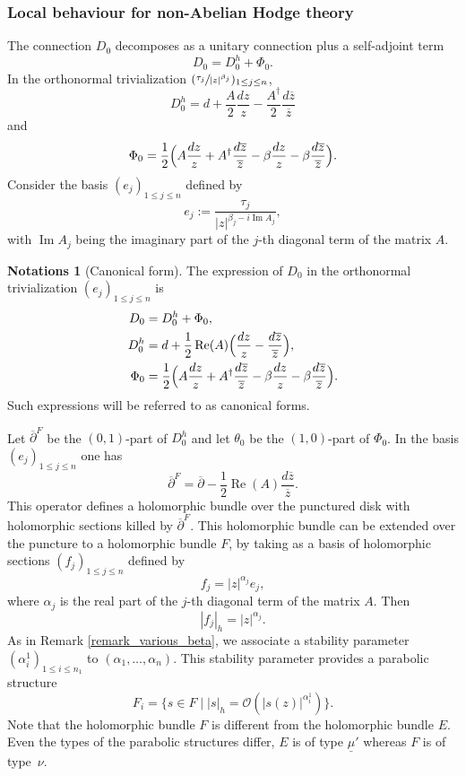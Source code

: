 \documentclass[JEP,XML,SOM,NoEqCountersInSection,Unicode,published]{cedram}
\theoremstyle{definition}
\newtheorem{notations}[definition]{Notations}
\theoremstyle{plain}
\DeclareMathOperator{\Imm}{Im}
\DeclareMathOperator{\Ree}{Re}
\newcommand{\drond}{\overline{\partial}}
\begin{document}
\subsubsection{Local behaviour for non-Abelian Hodge theory}\label{subsection_local_naht}
The connection $D_0$ decomposes as a unitary connection plus a self-adjoint term
\[
D_0= D_0^h + \Phi_0.
\]
In the orthonormal trivialization $(\sfrac{\tau_j}{|z|^{\beta_j }})_{1\le j \le n}$,
\[
D_0^h = d + \frac{A}{2} \frac{d z}{z} - \frac{A^{\dagger}}{2} \frac{d\overline{z}}{\overline{z}}
\]
and
\[
\Phi_0 = \frac{1}{2} \Bigl(A\frac{d z}{z} + A^{\dagger}\frac{d\overline{z}}{\overline{z}} - \beta \frac{d z}{z} - \beta \frac{d \overline{z}}{\overline{z}}\Bigr).
\]
Consider the basis $(e_j)_{1\le j \le n} $ defined by
\[
e_j := \frac{\tau_j}{\left|z\right|^{\beta_j- i \Imm A_j}},
\]
with $\Imm A_j$ being the imaginary part of the $j$-th diagonal term of the matrix $A$.
\begin{notations}[Canonical form]\label{notations_canonical_form}
The expression of $D_0$ in the orthonormal trivialization $(e_j)_{1\le j\le n}$ is
\begin{align*}
D_0 &= D_0^h + \Phi_0,\\
D_0^h &= d +\frac{1}{2} \Ree (A) \Bigl(\frac{d z}{z}- \frac{d\overline{z}}{\overline{z}}\Bigr),\\
\Phi_0 &= \frac{1}{2} \Bigl(A\frac{d z}{z} + A^{\dagger}\frac{d\overline{z}}{\overline{z}} - \beta \frac{d z}{z} - \beta \frac{d \overline{z}}{\overline{z}}\Bigr).
\end{align*}
Such expressions will be referred to as canonical forms.
\end{notations}
Let $\overline{\partial}^F$ be the $(0,1)$-part of $D_0^h$ and let $\theta_0$ be the $(1,0)$-part of $\Phi_0$. In the basis $(e_j)_{1\le j \le n} $ one has
\[
\overline{\partial}^F = \drond - \frac{1}{2} \Ree (A) \frac{d\overline{z}}{\overline{z}}.
\]
This operator defines a holomorphic bundle over the punctured disk with holomorphic sections killed by $\drond^F$. This holomorphic bundle can be extended over the puncture to a holomorphic bundle $F$, by taking as a basis of holomorphic sections $(f_j)_{1\le j \le n}$ defined by
\[
f_j = |z|^{\alpha_j} e_j,
\]
where $\alpha_j$ is the real part of the $j$-th diagonal term of the matrix $A$. Then
\[
|f_j|_h = \left|z\right|^{\alpha_j}.
\]
As in Remark \ref{remark_various_beta}, we associate a stability parameter $(\alpha^1_i)_{1\le i \le n_1}$ to $(\alpha_1,\dots,\alpha_n)$.
This stability parameter provides a parabolic structure
\[
F_i =\lbrace s\in F\mid |s|_h=\mathcal{O}(|s(z)|^{\alpha_i^1})\rbrace.
\]
Note that the holomorphic bundle $F$ is different from the holomorphic bundle $E$. Even the types of the parabolic structures differ, $E$ is of type $\underline{\mu}'$ whereas $F$ is of type~$\nu$.
\end{document}
